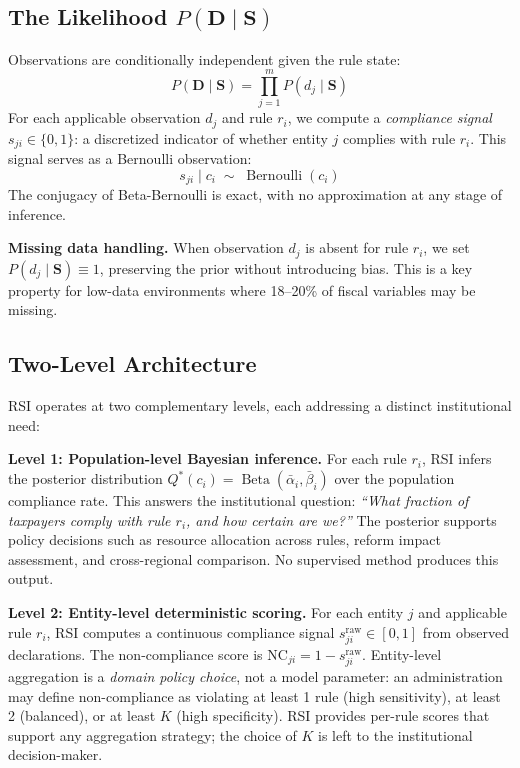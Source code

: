 \documentclass[letterpaper]{article}
\begin{document}
\subsection{The Likelihood $P(\mathbf{D} \mid \mathbf{S})$}

Observations are conditionally independent given the rule state:
\[
  P(\mathbf{D} \mid \mathbf{S}) = \prod_{j=1}^m P(d_j \mid \mathbf{S})
\]
For each applicable observation $d_j$ and rule $r_i$, we compute a
\emph{compliance signal} $s_{ji} \in \{0,1\}$: a discretized indicator
of whether entity $j$ complies with rule $r_i$. This signal serves as
a Bernoulli observation:
\[
  s_{ji} \mid c_i \;\sim\; \operatorname{Bernoulli}(c_i)
\]
The conjugacy of Beta-Bernoulli is exact, with no approximation at any
stage of inference.

\medskip
\noindent\textbf{Missing data handling.} When observation $d_j$ is
absent for rule $r_i$, we set $P(d_j \mid \mathbf{S}) \equiv 1$,
preserving the prior without introducing bias. This is a key property
for low-data environments where 18--20\% of fiscal variables may be
missing.

\subsection{Two-Level Architecture}
\label{sec:twolevels}

RSI operates at two complementary levels, each addressing a distinct
institutional need:

\medskip
\noindent\textbf{Level 1: Population-level Bayesian inference.}
For each rule $r_i$, RSI infers the posterior distribution
$Q^*(c_i) = \operatorname{Beta}(\bar{\alpha}_i, \bar{\beta}_i)$ over
the population compliance rate. This answers the institutional question:
\emph{``What fraction of taxpayers comply with rule $r_i$, and how
certain are we?''} The posterior supports policy decisions such as
resource allocation across rules, reform impact assessment, and
cross-regional comparison. No supervised method produces this output.

\medskip
\noindent\textbf{Level 2: Entity-level deterministic scoring.}
For each entity $j$ and applicable rule $r_i$, RSI computes a
continuous compliance signal $s_{ji}^{\mathrm{raw}} \in [0,1]$ from
observed declarations. The non-compliance score is
$\mathrm{NC}_{ji} = 1 - s_{ji}^{\mathrm{raw}}$. Entity-level
aggregation is a \emph{domain policy choice}, not a model parameter:
an administration may define non-compliance as violating at least 1
rule (high sensitivity), at least 2 (balanced), or at least $K$
(high specificity). RSI provides per-rule scores that support any
aggregation strategy; the choice of $K$ is left to the institutional
decision-maker.
\end{document}
